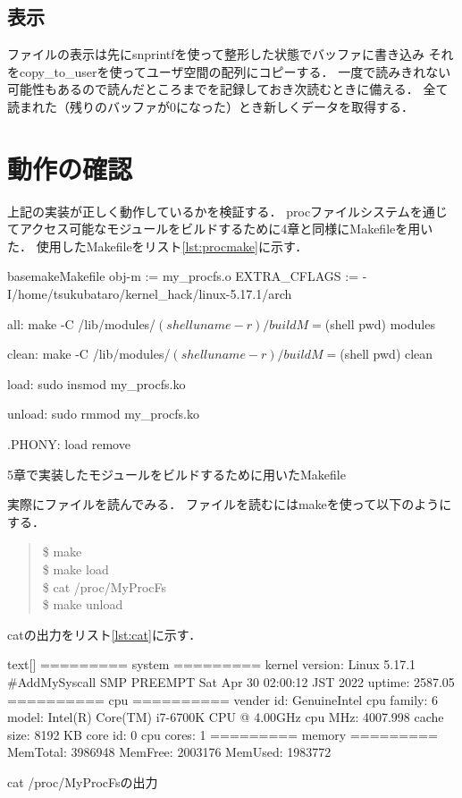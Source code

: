 \subsection{表示}
ファイルの表示は先にsnprintfを使って整形した状態でバッファに書き込み
それをcopy\_to\_userを使ってユーザ空間の配列にコピーする．
一度で読みきれない可能性もあるので読んだところまでを記録しておき次読むときに備える．
全て読まれた（残りのバッファが0になった）とき新しくデータを取得する．

\section{動作の確認}
上記の実装が正しく動作しているかを検証する．
procファイルシステムを通じてアクセス可能なモジュールをビルドするために4章と同様にMakefileを用いた．
使用したMakefileをリスト\ref{lst:procmake}に示す．
\begin{longlisting}
\begin{myminted}{basemake}{Makefile}
obj-m := my_procfs.o
EXTRA_CFLAGS := -I/home/tsukubataro/kernel_hack/linux-5.17.1/arch

all:
	make -C /lib/modules/$(shell uname -r)/build M=$(shell pwd) modules

clean:
	make -C /lib/modules/$(shell uname -r)/build M=$(shell pwd) clean

load:
	sudo insmod my_procfs.ko

unload:
	sudo rmmod my_procfs.ko

.PHONY: load remove
\end{myminted}
\caption{5章で実装したモジュールをビルドするために用いたMakefile}
\label{lst:procmake}
\end{longlisting}

実際にファイルを読んでみる．
ファイルを読むにはmakeを使って以下のようにする．
\begin{quote}
\$ make \\
\$ make load \\
\$ cat /proc/MyProcFs \\
\$ make unload
\end{quote}

catの出力をリスト\ref{lst:cat}に示す．
\begin{longlisting}
\begin{myminted}{text}[]
========= system =========
kernel version: Linux 5.17.1 #AddMySyscall SMP PREEMPT Sat Apr 30 02:00:12 JST 2022
uptime: 2587.05
========== cpu ==========
vender id: GenuineIntel
cpu family: 6
model: Intel(R) Core(TM) i7-6700K CPU @ 4.00GHz
cpu MHz: 4007.998
cache size: 8192 KB
core id: 0
cpu cores: 1
========= memory =========
MemTotal: 3986948
MemFree: 2003176
MemUsed: 1983772
\end{myminted}
\caption{cat /proc/MyProcFsの出力}
\label{lst:cat}
\end{longlisting}

